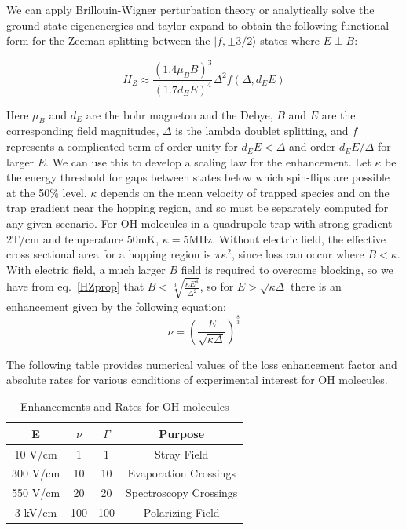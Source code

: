 \documentclass[%
 reprint,
 amsmath,amssymb,
 aps,
prl,
]{revtex4-1}
\begin{document}
We can apply Brillouin-Wigner perturbation theory or analytically solve the ground state eigenenergies and taylor expand to obtain the following functional form for the Zeeman splitting between the $|f,\pm3/2\rangle$ states where $E\!\perp\! B$:

\begin{equation}
\label{eq:HZprop}
H_Z\approx \frac{(1.4\mu_BB)^3}{(1.7d_EE)^4}\Delta^2 f(\Delta,d_EE)
\end{equation}

\noindent Here $\mu_B$ and $d_E$ are the bohr magneton and the Debye, $B$ and $E$ are the corresponding field magnitudes, $\Delta$ is the lambda doublet splitting, and $f$ represents a complicated term of order unity for $d_EE < \Delta$ and order $d_EE/\Delta$ for larger $E$. We can use this to develop a scaling law for the enhancement. Let $\kappa$ be the energy threshold for gaps between states below which spin-flips are possible at the 50\% level. $\kappa$ depends on the mean velocity of trapped species and on the trap gradient near the hopping region, and so must be separately computed for any given scenario. For OH molecules in a  quadrupole trap \cite{sawyer2008} with strong gradient $2 \text{T/cm}$ and temperature $50 \text{mK}$, $\kappa=5\text{MHz}$. Without electric field, the effective cross sectional area for a hopping region is $\pi \kappa^2$, since loss can occur where $B<\kappa$. With electric field, a much larger $B$ field is required to overcome blocking, so we have from eq.~\ref{HZprop} that $B < \sqrt[3]{\frac{\kappa E^4}{\Delta^2}}$, so for $E>\sqrt{\kappa\Delta}$ there is an enhancement given by the following equation:
\begin{equation}
\nu = \left(\frac{E}{\sqrt{\kappa\Delta}}\right)^\frac{8}{3}
\label{eq:blimit}
\end{equation} 

The following table provides numerical values of the loss enhancement factor and absolute rates for various conditions of experimental interest for OH molecules.

\begin{table}[h]
\caption{Enhancements and Rates for OH molecules}
\label{tab:rates}
\begin{tabular}{c|ccc}
\toprule
E & $\nu$ & $\Gamma$ & Purpose \\
\toprule
10 V/cm & 1 & 1 & Stray Field \\
300 V/cm & 10 & 10 & Evaporation Crossings\\
550 V/cm & 20 & 20 & Spectroscopy Crossings\\
3 kV/cm & 100 & 100 & Polarizing Field\\
\toprule
\end{tabular}
\end{table}
\end{document}
